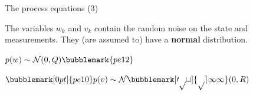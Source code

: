 \documentclass[compress]{beamer}
\begin{document}
\begin{frame}{The process equations (3)}

    The variables $w_k$ and $v_k$ contain the random noise on the state and
    measurements. They (are assumed to) have a \textbf{normal} distribution.

    \vspace{3em}

    \Huge\centering
    $p(w) \sim \mathcal{N}(0, Q)\bubblemark{pe12}$

    $\bubblemark[0pt]{pe10}p(v) \sim \mathcal{N\bubblemark[0pt]{pe11}}(0, R)$




\end{frame}
\end{document}
